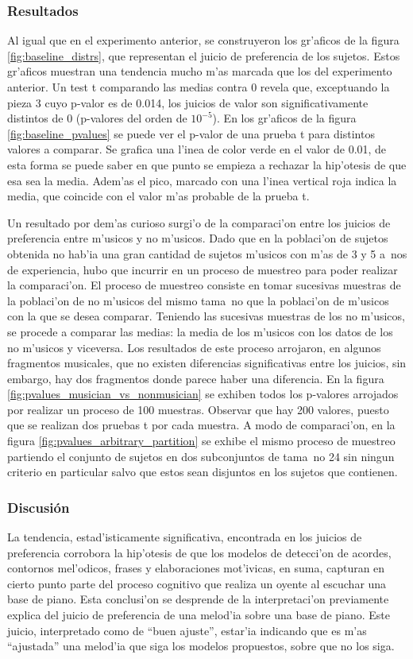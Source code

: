 \subsubsection{Resultados}
Al igual que en el experimento anterior, se construyeron los gr'aficos de la figura \ref{fig:baseline_distrs}, que representan el 
juicio de preferencia de los sujetos. Estos gr'aficos muestran una tendencia mucho m'as marcada que los del experimento anterior.
 Un test t comparando las medias contra 0 revela que, exceptuando la pieza 3 
cuyo p-valor es de 0.014, los juicios de valor son significativamente distintos de 0 (p-valores del orden de $10^{-5}$). En los gr'aficos de la figura \ref{fig:baseline_pvalues} se puede ver el p-valor de una prueba t para distintos valores a comparar. Se grafica una l'inea de color verde en el valor de 0.01, de esta forma se puede saber en que punto se empieza a rechazar la hip'otesis de que esa sea la media. Adem'as el pico, marcado con una l'inea
vertical roja indica la media, que coincide con el valor m'as probable de la prueba t.

Un resultado por dem'as curioso surgi'o de la comparaci'on entre los juicios de preferencia entre m'usicos y no m'usicos. Dado que en la poblaci'on 
de sujetos obtenida no hab'ia una gran cantidad de sujetos m'usicos con m'as de 3 y 5 a~nos de experiencia, hubo que incurrir en un proceso de muestreo
para poder realizar la comparaci'on. El proceso de muestreo consiste en tomar sucesivas muestras de la poblaci'on de no m'usicos del mismo tama~no que la 
poblaci'on de m'usicos con la que se desea comparar. Teniendo las sucesivas muestras de los no m'usicos, se procede a comparar las medias: la media de los
m'usicos con los datos de los no m'usicos y viceversa. Los resultados de este proceso arrojaron, en algunos fragmentos musicales, que no existen diferencias
significativas entre los juicios, sin embargo, hay dos fragmentos donde parece haber una diferencia. En la figura \ref{fig:pvalues_musician_vs_nonmusician}
se exhiben todos los p-valores arrojados por realizar un proceso de 100 muestras. Observar que hay 200 valores, puesto que se realizan dos pruebas t por 
cada muestra. A modo de comparaci'on, en la figura \ref{fig:pvalues_arbitrary_partition} se exhibe el mismo proceso de muestreo partiendo el conjunto 
de sujetos en dos subconjuntos de tama~no 24 sin ningun criterio en particular salvo que estos sean disjuntos en los sujetos que contienen.

\subsubsection{Discusi\'on}
La tendencia, estad'isticamente significativa, encontrada en los juicios de preferencia corrobora la hip'otesis de que los modelos de detecci'on de 
acordes, contornos mel'odicos, frases y elaboraciones mot'ivicas, en suma, capturan en cierto punto parte del proceso cognitivo que realiza un oyente al
escuchar una base de piano. Esta conclusi'on se desprende de la interpretaci'on previamente explica del juicio de preferencia de una melod'ia sobre
una base de piano. Este juicio, interpretado como de ``buen ajuste'', estar'ia indicando que es m'as ``ajustada'' una melod'ia que siga los modelos 
propuestos, sobre que no los siga.

